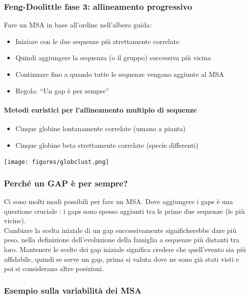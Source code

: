 \documentclass{article}
\begin{document}
\subsubsection{Feng-Doolittle fase 3: allineamento progressivo\\}
Fare un MSA in base all'ordine nell'albero guida:
\begin{itemize}
    \item Iniziare con le due sequenze più strettamente correlate
    \item Quindi aggiungere la sequenza (o il gruppo) successiva più vicina
    \item Continuare fino a quando tutte le sequenze vengono aggiunte al MSA
    \item Regola: “Un gap è per sempre”
\end{itemize}
\paragraph{Metodi euristici per l'allineamento multiplo di sequenze}
\begin{itemize}
    \item Cinque globine lontanamente correlate (umano a pianta)
    \item Cinque globine beta strettamente correlate (specie differenti)
\end{itemize}
\begin{center}
    \texttt{[image: figures/globclust.png]}
\end{center}
\subsubsection{Perché un GAP è per sempre?}
Ci sono molti modi possibili per fare un MSA. Dove aggiungere i gaps è una questione cruciale : i gaps
sono spesso aggiunti tra le prime due sequenze (le più
vicine).\\
Cambiare la scelta iniziale di un gap successivamente
significherebbe dare più peso, nella definizione
dell'evoluzione della famiglia a sequenze più distanti tra
loro. Mantenere le scelte dei gap iniziale significa credere che
quell'evento sia più affidabile, quindi se serve un gap, prima
si valuta dove ne sono già stati visti e poi si considerano
altre posizioni.
\subsubsection{Esempio sulla variabilità dei MSA}
\end{document}
